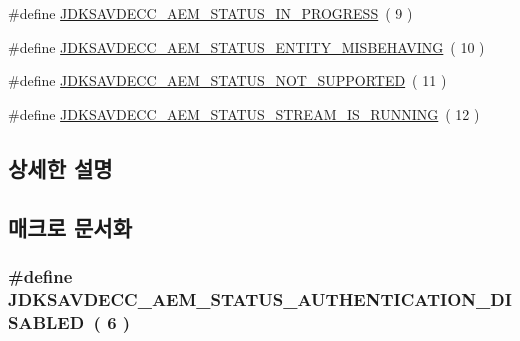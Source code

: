 \begin{DoxyCompactItemize}
\#define \hyperlink{group__aecpdu__aem__status_gad58044409b89cdd06c622cb99cd81098}{J\+D\+K\+S\+A\+V\+D\+E\+C\+C\+\_\+\+A\+E\+M\+\_\+\+S\+T\+A\+T\+U\+S\+\_\+\+I\+N\+\_\+\+P\+R\+O\+G\+R\+E\+SS}~( 9 )
\item 
\#define \hyperlink{group__aecpdu__aem__status_ga1d1649f466d050a6c1b6c6d377bc5ad9}{J\+D\+K\+S\+A\+V\+D\+E\+C\+C\+\_\+\+A\+E\+M\+\_\+\+S\+T\+A\+T\+U\+S\+\_\+\+E\+N\+T\+I\+T\+Y\+\_\+\+M\+I\+S\+B\+E\+H\+A\+V\+I\+NG}~( 10 )
\item 
\#define \hyperlink{group__aecpdu__aem__status_ga31246b7a1c0bf6471b6acea61bf0fcfd}{J\+D\+K\+S\+A\+V\+D\+E\+C\+C\+\_\+\+A\+E\+M\+\_\+\+S\+T\+A\+T\+U\+S\+\_\+\+N\+O\+T\+\_\+\+S\+U\+P\+P\+O\+R\+T\+ED}~( 11 )
\item 
\#define \hyperlink{group__aecpdu__aem__status_ga7994587b47517851efc119ab46073b8c}{J\+D\+K\+S\+A\+V\+D\+E\+C\+C\+\_\+\+A\+E\+M\+\_\+\+S\+T\+A\+T\+U\+S\+\_\+\+S\+T\+R\+E\+A\+M\+\_\+\+I\+S\+\_\+\+R\+U\+N\+N\+I\+NG}~( 12 )
\end{DoxyCompactItemize}


\subsection{상세한 설명}


\subsection{매크로 문서화}
\subsubsection[{\texorpdfstring{J\+D\+K\+S\+A\+V\+D\+E\+C\+C\+\_\+\+A\+E\+M\+\_\+\+S\+T\+A\+T\+U\+S\+\_\+\+A\+U\+T\+H\+E\+N\+T\+I\+C\+A\+T\+I\+O\+N\+\_\+\+D\+I\+S\+A\+B\+L\+ED}{JDKSAVDECC_AEM_STATUS_AUTHENTICATION_DISABLED}}]{\setlength{\rightskip}{0pt plus 5cm}\#define J\+D\+K\+S\+A\+V\+D\+E\+C\+C\+\_\+\+A\+E\+M\+\_\+\+S\+T\+A\+T\+U\+S\+\_\+\+A\+U\+T\+H\+E\+N\+T\+I\+C\+A\+T\+I\+O\+N\+\_\+\+D\+I\+S\+A\+B\+L\+ED~( 6 )}\hypertarget{group__aecpdu__aem__status_ga11ffc82dd78842947956c7268948db4e}{}\label{group__aecpdu__aem__status_ga11ffc82dd78842947956c7268948db4e}


